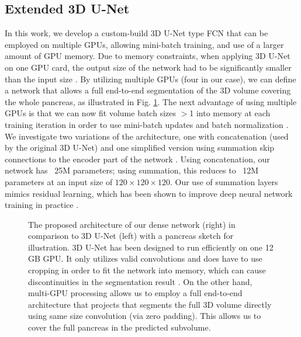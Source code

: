 \documentclass[a4paper]{spie}  %
\begin{document}
\subsection{Extended 3D U-Net} In this work, we develop a custom-build 3D U-Net type FCN that can be employed on multiple GPUs, allowing mini-batch training, and use of a larger amount of GPU memory. Due to memory constraints, when applying 3D U-Net on one GPU card, the output size of the network had to be significantly smaller than the input size \cite{cciccek20163d}. By utilizing multiple GPUs (four in our case), we can define a network that allows a full end-to-end segmentation of the 3D volume covering the whole pancreas, as illustrated in Fig. \ref{fig:network_proposal}. The next advantage of using multiple GPUs is that we can now fit volume batch sizes $>$1 into memory at each training iteration in order to use mini-batch updates and batch normalization \cite{ioffe2015batch}. We investigate two variations of the architecture, one with concatenation (used by the original 3D U-Net) and one simplified version using summation skip connections to the encoder part of the network \cite{drozdzal2016importance}. Using concatenation, our network has ~25M parameters; using summation, this reduces to ~12M parameters at an input size of $120\times120\times120$. Our use of summation layers mimics residual learning, which has been shown to improve deep neural network training in practice \cite{he2016deep}.
\begin{figure}[tb]
  \centering
\caption{ The proposed architecture of our dense network (right) in comparison to 3D U-Net\cite{cciccek20163d} (left) with a pancreas sketch for illustration. 3D U-Net has been designed to run efficiently on one 12 GB GPU. It only utilizes valid convolutions and does have to use cropping in order to fit the network into memory, which can cause discontinuities in the segmentation result \cite{roth2017hierarchical}. On the other hand, multi-GPU processing allows us to employ a full end-to-end architecture that projects that segments the full 3D volume directly using same size convolution (via zero padding). This allows us to cover the full pancreas in the predicted subvolume. \label{fig:network_proposal}}
\end{figure}
\end{document}
